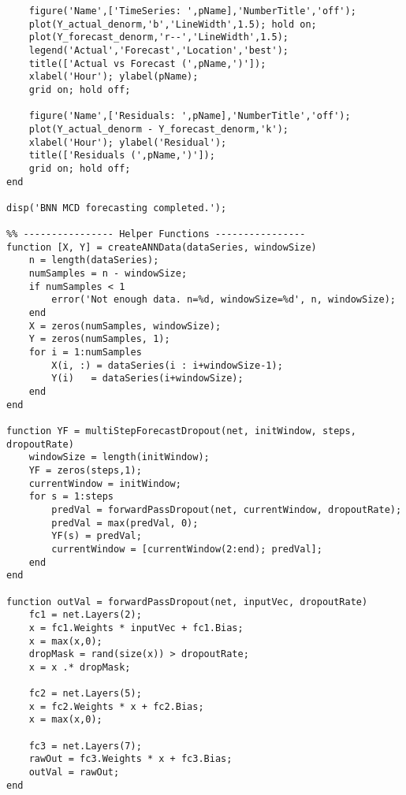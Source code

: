\begin{verbatim}
    figure('Name',['TimeSeries: ',pName],'NumberTitle','off');
    plot(Y_actual_denorm,'b','LineWidth',1.5); hold on;
    plot(Y_forecast_denorm,'r--','LineWidth',1.5);
    legend('Actual','Forecast','Location','best');
    title(['Actual vs Forecast (',pName,')']);
    xlabel('Hour'); ylabel(pName);
    grid on; hold off;
    
    figure('Name',['Residuals: ',pName],'NumberTitle','off');
    plot(Y_actual_denorm - Y_forecast_denorm,'k');
    xlabel('Hour'); ylabel('Residual');
    title(['Residuals (',pName,')']);
    grid on; hold off;
end

disp('BNN MCD forecasting completed.');

%% ---------------- Helper Functions ----------------
function [X, Y] = createANNData(dataSeries, windowSize)
    n = length(dataSeries);
    numSamples = n - windowSize;
    if numSamples < 1
        error('Not enough data. n=%d, windowSize=%d', n, windowSize);
    end
    X = zeros(numSamples, windowSize);
    Y = zeros(numSamples, 1);
    for i = 1:numSamples
        X(i, :) = dataSeries(i : i+windowSize-1);
        Y(i)   = dataSeries(i+windowSize);
    end
end

function YF = multiStepForecastDropout(net, initWindow, steps, dropoutRate)
    windowSize = length(initWindow);
    YF = zeros(steps,1);
    currentWindow = initWindow;
    for s = 1:steps
        predVal = forwardPassDropout(net, currentWindow, dropoutRate);
        predVal = max(predVal, 0);
        YF(s) = predVal;
        currentWindow = [currentWindow(2:end); predVal];
    end
end

function outVal = forwardPassDropout(net, inputVec, dropoutRate)
    fc1 = net.Layers(2);
    x = fc1.Weights * inputVec + fc1.Bias;
    x = max(x,0);
    dropMask = rand(size(x)) > dropoutRate;
    x = x .* dropMask;
    
    fc2 = net.Layers(5);
    x = fc2.Weights * x + fc2.Bias;
    x = max(x,0);
    
    fc3 = net.Layers(7);
    rawOut = fc3.Weights * x + fc3.Bias;
    outVal = rawOut;
end
\end{verbatim}
